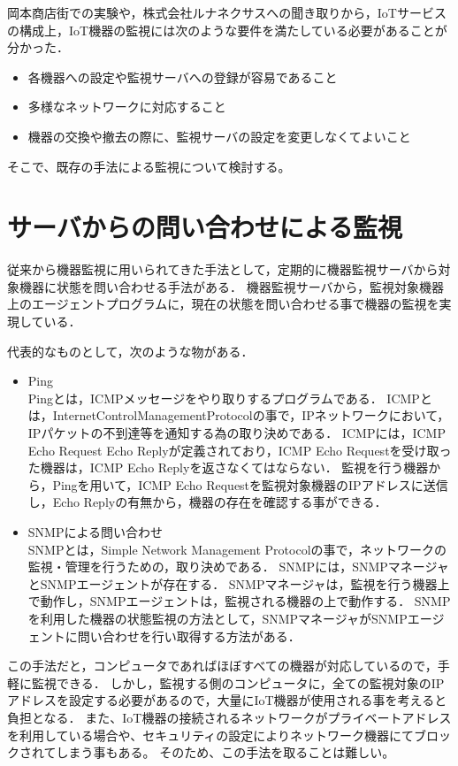 
岡本商店街での実験や，株式会社ルナネクサスへの聞き取りから，IoTサービスの構成上，IoT機器の監視には次のような要件を満たしている必要があることが分かった．
\begin{itemize}
\item 各機器への設定や監視サーバへの登録が容易であること
\item 多様なネットワークに対応すること
\item 機器の交換や撤去の際に、監視サーバの設定を変更しなくてよいこと
\end{itemize}
そこで、既存の手法による監視について検討する。

\section{サーバからの問い合わせによる監視}
	従来から機器監視に用いられてきた手法として，定期的に機器監視サーバから対象機器に状態を問い合わせる手法がある．
	機器監視サーバから，監視対象機器上のエージェントプログラムに，現在の状態を問い合わせる事で機器の監視を実現している．
	\medskip

	代表的なものとして，次のような物がある．
	\begin{itemize}
		\item Ping\\
			Pingとは，ICMPメッセージをやり取りするプログラムである．
			ICMPとは，InternetControlManagementProtocolの事で，IPネットワークにおいて，IPパケットの不到達等を通知する為の取り決めである．
			ICMPには，ICMP Echo Request Echo Replyが定義されており，ICMP Echo Requestを受け取った機器は，ICMP Echo Replyを返さなくてはならない．
			監視を行う機器から，Pingを用いて，ICMP Echo Requestを監視対象機器のIPアドレスに送信し，Echo Replyの有無から，機器の存在を確認する事ができる．
		\item SNMPによる問い合わせ\\
			SNMPとは，Simple Network Management Protocolの事で，ネットワークの監視・管理を行うための，取り決めである．
			SNMPには，SNMPマネージャとSNMPエージェントが存在する．
			SNMPマネージャは，監視を行う機器上で動作し，SNMPエージェントは，監視される機器の上で動作する．
			SNMPを利用した機器の状態監視の方法として，SNMPマネージャがSNMPエージェントに問い合わせを行い取得する方法がある．
	\end{itemize}
	
	この手法だと，コンピュータであればほぼすべての機器が対応しているので，手軽に監視できる．
	しかし，監視する側のコンピュータに，全ての監視対象のIPアドレスを設定する必要があるので，大量にIoT機器が使用される事を考えると負担となる．
	また、IoT機器の接続されるネットワークがプライベートアドレスを利用している場合や、セキュリティの設定によりネットワーク機器にてブロックされてしまう事もある。
	そのため、この手法を取ることは難しい。

